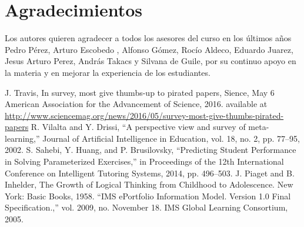 \documentclass[letterpaper, 10 pt, conference]{ieeeconf}  %
\begin{document}
\addtolength{\textheight}{-12cm}   %








\section*{Agradecimientos}

Los autores quieren agradecer a todos los asesores del curso en los últimos años Pedro Pérez, Arturo Escobedo , Alfonso Gómez, Rocío Aldeco, Eduardo Juarez, Jesus Arturo Perez, András Takacs y Silvana de Guile, por su continuo apoyo en la materia y en mejorar la experiencia de los estudiantes.




\begin{thebibliography}{99}

 J. Travis,	In survey, most give thumbs-up to pirated papers, Sience, May 6  American Association for the Advancement of Science, 2016. available at \url{http://www.sciencemag.org/news/2016/05/survey-most-give-thumbs-pirated-papers}
 R. Vilalta and Y. Drissi, “A perspective view and survey of meta-learning,” Journal of Artificial Intelligence in Education, vol. 18, no. 2, pp. 77–95, 2002.
 S. Sahebi, Y. Huang, and P. Brusilovsky, “Predicting Student Performance in Solving Parameterized Exercises,” in Proceedings of the 12th International Conference on Intelligent Tutoring Systems, 2014, pp. 496–503.
 J. Piaget and B. Inhelder, The Growth of Logical Thinking from Childhood to Adolescence. New York: Basic Books, 1958.
 “IMS ePortfolio Information Model. Version 1.0 Final Specification.,” vol. 2009, no. November 18. IMS Global Learning Consortium, 2005.

\end{thebibliography}
\end{document}
